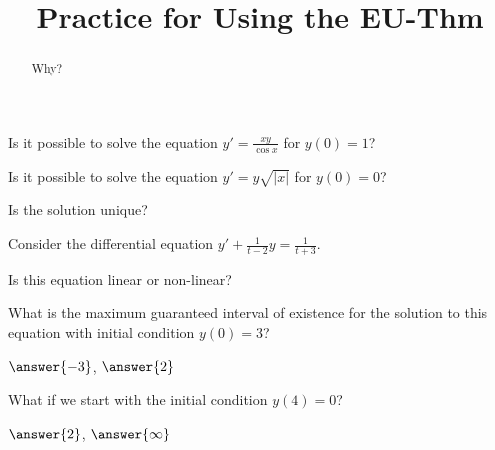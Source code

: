 \documentclass{ximera}
\title{Practice for Using the EU-Thm}
\begin{document}
\begin{abstract}
    Why?
\end{abstract}
\maketitle


\begin{exercise}
    Is it possible to solve the equation $y' = \frac{xy}{\cos x}$ for $y(0) = 1$?
    \begin{multipleChoice}
    \end{multipleChoice}
\end{exercise}

\begin{exercise}
    Is it possible to solve the equation $y' = y\sqrt{\lvert x\rvert}$ for $y(0) = 0$?
    \begin{multipleChoice}
    \end{multipleChoice}
    \begin{problem}
        Is the solution unique?
        \begin{multipleChoice}
        \end{multipleChoice}
    \end{problem}
\end{exercise}

\begin{exercise}
    Consider the differential equation $y' + \frac{1}{t-2}y = \frac{1}{t+3}$. 
    
    Is this equation linear or non-linear?
    \begin{multipleChoice}
    \end{multipleChoice}
    \begin{problem}
        What is the maximum guaranteed interval of existence for the solution to this equation with initial condition $y(0) = 3$?
        
        \wordChoice{\choice[correct]{(},\choice{[}}$\answer{-3}$, $\answer{2}$\wordChoice{\choice[correct]{)},\choice{]}}
        \begin{problem}        
            What if we start with the initial condition $y(4) = 0$?
            
            \wordChoice{\choice[correct]{(},\choice{[}}$\answer{2}$, $\answer{\infty}$\wordChoice{\choice[correct]{)},\choice{]}}
        \end{problem}
    \end{problem}
\end{exercise}
\end{document}
